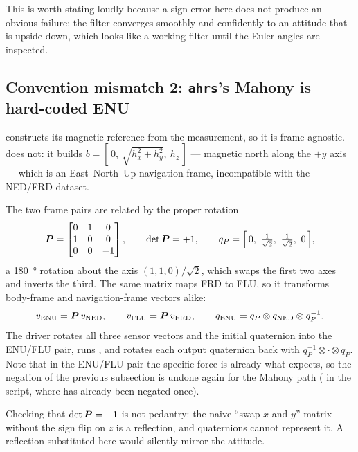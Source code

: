 This is worth stating loudly because a sign error here does not produce an obvious failure: the
filter converges smoothly and confidently to an attitude that is upside down, which looks like a
working filter until the Euler angles are inspected.

\subsection{Convention mismatch 2: \texttt{ahrs}'s Mahony is hard-coded ENU}

 constructs its magnetic reference from the measurement, so it is
frame-agnostic.  does not: it builds
$b = [\,0,\ \sqrt{h_x^2+h_y^2},\ h_z\,]$ --- magnetic north along the $+y$ axis --- which is an
East--North--Up navigation frame, incompatible with the NED/FRD dataset.

The two frame pairs are related by the proper rotation
\begin{equation}
\mP = \begin{bmatrix} 0&1&0\\ 1&0&0\\ 0&0&-1\end{bmatrix},
\qquad \det\mP = +1,
\qquad q_P = \Bigl[\,0,\ \tfrac{1}{\sqrt2},\ \tfrac{1}{\sqrt2},\ 0\,\Bigr],
\label{eq:av-enu}
\end{equation}
a \SI{180}{\degree} rotation about the axis $(1,1,0)/\sqrt2$, which swaps the first two axes and
inverts the third. The same matrix maps FRD to FLU, so it transforms body-frame and navigation-frame
vectors alike:
\begin{equation}
v_{\text{ENU}} = \bm{P}\, v_{\text{NED}},
\qquad v_{\text{FLU}} = \bm{P}\, v_{\text{FRD}},
\qquad q_{\text{ENU}} = q_P \otimes q_{\text{NED}} \otimes q_P^{-1}.
\label{eq:av-enuq}
\end{equation}
The driver rotates all three sensor vectors and the initial quaternion into the ENU/FLU pair, runs
, and rotates each output quaternion back with $q_P^{-1}\otimes\cdot\otimes q_P$. Note
that in the ENU/FLU pair the specific force is already what  expects, so the negation of
the previous subsection is undone again for the Mahony path ( in the
script, where  has already been negated once).

Checking that $\det\bm{P} = +1$ is not pedantry: the naive ``swap $x$ and $y$'' matrix without the sign
flip on $z$ is a reflection, and quaternions cannot represent it. A reflection substituted here
would silently mirror the attitude.

